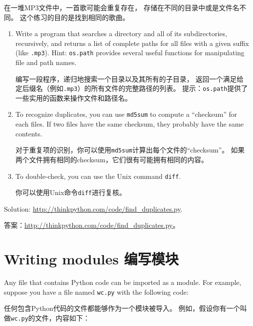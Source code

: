 \documentclass[10pt]{book}
\begin{document}
\begin{CJK}{UTF8}{gbsn}
\begin{exercise}
在一堆MP3文件中，一首歌可能会重复存在，
存储在不同的目录中或是文件名不同。
这个练习的目的是找到相同的歌曲。

\begin{enumerate}

\item Write a program that searches a directory and all of its
subdirectories, recursively, and returns a list of complete paths
for all files with a given suffix (like {\tt .mp3}).
Hint: {\tt os.path} provides several useful functions for
manipulating file and path names.

编写一段程序，递归地搜索一个目录以及其所有的子目录，
返回一个满足给定后缀名（例如{\tt .mp3}）的所有文件的完整路径的列表。
提示：{\tt os.path}提供了一些实用的函数来操作文件和路径名。

\item To recognize duplicates, you can use {\tt md5sum}
to compute a ``checksum'' for each files.  If two files have
the same checksum, they probably have the same contents.

对于重复项的识别，你可以使用{\tt md5sum}计算出每个文件的``checksum''。
如果两个文件拥有相同的checksum，它们很有可能拥有相同的内容。

\item To double-check, you can use the Unix command {\tt diff}.

你可以使用Unix命令{\tt diff}进行复核。

\end{enumerate}

Solution: \url{http://thinkpython.com/code/find_duplicates.py}.

答案：\url{http://thinkpython.com/code/find_duplicates.py}。


\end{exercise}


\section{Writing modules 编写模块}
\label{modules}

Any file that contains Python code can be imported as a module.
For example, suppose you have a file named {\tt wc.py} with the following
code:

任何包含Python代码的文件都能够作为一个模块被导入。
例如，假设你有一个叫做{\tt wc.py}的文件，内容如下：


\end{CJK}
\end{document}
